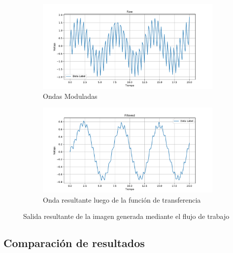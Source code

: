 \begin{figure}[htbp]
    \centering
    \begin{subfigure}[b]{0.45\textwidth}
        \centering
        \includegraphics[width=\textwidth]{fig/especifico_2/raw.pdf}
        \caption{Ondas Moduladas}
        \label{fig:onda_modulada_zedboard}
    \end{subfigure}
    \hfill
    \begin{subfigure}[b]{0.45\textwidth}
        \centering
        \includegraphics[width=\textwidth]{fig/especifico_2/Filtered.pdf}
        \caption{Onda resultante luego de la función de transferencia}
        \label{fig:onda_filtrada_zedboard}
    \end{subfigure}
    \caption{Salida resultante de la imagen generada mediante el flujo de trabajo}
    \label{fig:salida_resultante_diagrama_graficos_zedboard}
\end{figure}

\subsection{Comparación de resultados}

